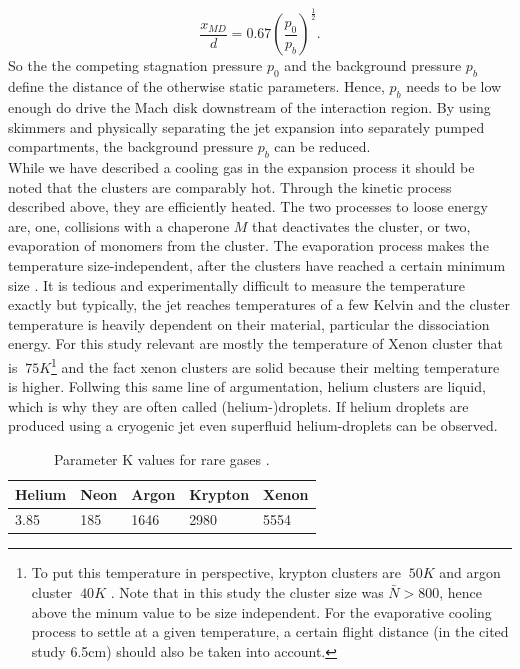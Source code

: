 \begin{equation}
\frac{x_{MD}}{d}=0.67\left(\frac{p_{0}}{p_{b}}\right)^{\frac{1}{2}}.
\label{eq:distance-of-mach-disk}
\end{equation}
So the the competing stagnation pressure $p_{0}$ and the background pressure $p_{b}$ define the distance of the otherwise static parameters. Hence, $p_{b}$ needs to be low enough do drive the Mach disk downstream of the interaction region. By using skimmers and physically separating the jet expansion into separately pumped compartments, the background pressure $p_{b}$ can be reduced.\\
While we have described a cooling gas in the expansion process it should be noted that the clusters are comparably hot. Through the kinetic process described above, they are efficiently heated. The two processes to loose energy are, one, collisions with a chaperone $M$ that deactivates the cluster, or two, evaporation of monomers from the cluster. The evaporation process makes the temperature size-independent, after the clusters have reached a certain minimum size \cite{Farges-1981-SurfSci}. It is tedious and experimentally difficult to measure the temperature exactly but typically, the jet reaches temperatures of a few Kelvin and the cluster temperature is heavily dependent on their material, particular the dissociation energy. For this study relevant are mostly the temperature of Xenon cluster that is $~75K$\footnote{To put this temperature in perspective, krypton clusters are $~50K$ and argon cluster $~40K$ \cite{Farges-1981-SurfSci,Gspann-1986-Springer}. Note that in this study the cluster size was $\bar{N} > 800$, hence above the minum value to be size independent. For the evaporative cooling process to settle at a given temperature, a certain flight distance (in the cited study 6.5cm) should also be taken into account.} and the fact xenon clusters are solid because their melting temperature is higher\cite{Gspann-1986-Springer}. Follwing this same line of argumentation, helium clusters are liquid, which is why they are often called (helium-)droplets. If helium droplets are produced using a cryogenic jet even superfluid helium-droplets can be observed.\\
\begin{table}
	\centering
		\begin{tabular}{ | l | l | l | l | l | }
			\hline
			Helium & Neon & Argon & Krypton & Xenon \\ \hline
			3.85 & 185 & 1646 & 2980 & 5554 \\ \hline
		\end{tabular}
	\caption{Parameter K values for rare gases \cite{Schorb-2012-Thesis}.}
	\label{tab:k-parameter}
\end{table}
